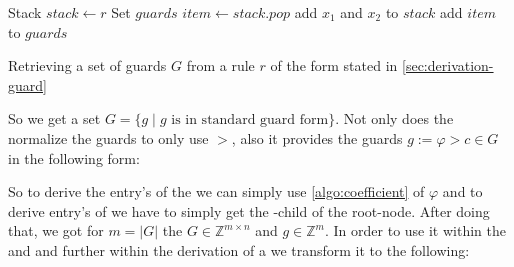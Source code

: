 \begin{algorithm}
	\begin{algorithmic}[1]
		 
			\State Stack $stack \gets r$
			\State Set $guards$
				\State $item \gets stack.pop$
					\State add $x_1$ and $x_2$ to $stack$
				\Else
					\State add $item$ to $guards$
				\EndIf				
			\EndWhile			
		\EndFunction		
	\end{algorithmic}
	\caption{Retrieving a set of guards $G$ from a rule $r$ of the form stated in \autoref{sec:derivation-guard}}
	\label{algo:decat-guards}
\end{algorithm}

So we get a set $G=\{ g \mid g \text{ is in standard guard form}\}$. Not only does the \seg normalize the guards to only use $>$, also it provides the guards $g:= \varphi > c \in G$ in the following form:\newline
\begin{figure}[H]
	\centering
\end{figure}

So to derive the entry's of the \guardmatrix we can simply use \autoref{algo:coefficient} of $\varphi$ and to derive entry's of \guardconstants we have to simply get the -child of the root-node.\newline
After doing that, we got for $m=|G|$ the \guardmatrix $G \in \mathbb{Z}^{m\times n}$ and \guardconstants $g \in \mathbb{Z}^m$. \newline
In order to use it within the \iterationmatrix and \iterationconstants and further within the derivation of a \gna we transform it to the following:

